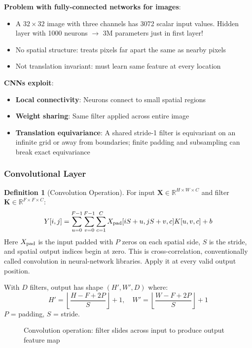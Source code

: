 \documentclass[11pt,twoside]{article}
\numberwithin{equation}{section}
\newcommand{\R}{\mathbb{R}}
\newcommand{\vect}[1]{\bm{#1}}
\theoremstyle{plain}
\theoremstyle{definition}
\newtheorem{definition}[theorem]{Definition}
\theoremstyle{remark}
\begin{document}
\textbf{Problem with fully-connected networks for images}:
\begin{itemize}
\item A $32\times32$ image with three channels has 3072 scalar input values. Hidden layer with 1000 neurons $\to$ 3M parameters just in first layer!
\item No spatial structure: treats pixels far apart the same as nearby pixels
\item Not translation invariant: must learn same feature at every location
\end{itemize}

\textbf{CNNs exploit}:
\begin{itemize}
\item \textbf{Local connectivity}: Neurons connect to small spatial regions
\item \textbf{Weight sharing}: Same filter applied across entire image
\item \textbf{Translation equivariance}: A shared stride-1 filter is equivariant on an infinite grid or away from boundaries; finite padding and subsampling can break exact equivariance
\end{itemize}

\subsubsection{Convolutional Layer}

\begin{definition}[Convolution Operation]
For input $\vect{X} \in \R^{H \times W \times C}$ and filter $\vect{K} \in \R^{F \times F \times C}$:
\[
Y[i,j]=\sum_{u=0}^{F-1}\sum_{v=0}^{F-1}\sum_{c=1}^C
X_{\rm pad}[iS+u,jS+v,c]K[u,v,c]+b
\]
Here $X_{\rm pad}$ is the input padded with $P$ zeros on each spatial side, $S$ is the stride, and spatial output indices begin at zero. This is cross-correlation, conventionally called convolution in neural-network libraries. Apply it at every valid output position.

With $D$ filters, output has shape $(H', W', D)$ where:
\[
H'=\left\lfloor\frac{H-F+2P}{S}\right\rfloor+1,\quad W'=\left\lfloor\frac{W-F+2P}{S}\right\rfloor+1
\]
$P$ = padding, $S$ = stride.
\end{definition}

\begin{figure}[H]
\centering
{}
\caption{Convolution operation: filter slides across input to produce output feature map}
\end{figure}
\end{document}
